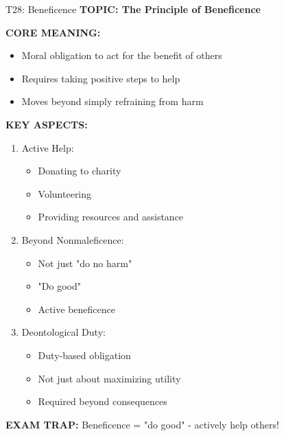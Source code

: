 \documentclass[8pt]{beamer}
\begin{document}
	\begin{frame}{T28: Beneficence}
		\fontsize{6.5}{7.5}\selectfont
		\textbf{TOPIC: The Principle of Beneficence}
		
		\vspace{0.1cm}
		\textbf{CORE MEANING:}
		\begin{itemize}
			\item Moral obligation to act for the benefit of others
			\item Requires taking positive steps to help
			\item Moves beyond simply refraining from harm
		\end{itemize}
		
		\vspace{0.1cm}
		\textbf{KEY ASPECTS:}
		\begin{enumerate}
			\item \textcolor{myblue}{Active Help:}
			\begin{itemize}
				\item Donating to charity
				\item Volunteering
				\item Providing resources and assistance
			\end{itemize}
			\item \textcolor{myblue}{Beyond Nonmaleficence:}
			\begin{itemize}
				\item Not just "do no harm"
				\item "Do good"
				\item Active beneficence
			\end{itemize}
			\item \textcolor{myblue}{Deontological Duty:}
			\begin{itemize}
				\item Duty-based obligation
				\item Not just about maximizing utility
				\item Required beyond consequences
			\end{itemize}
		\end{enumerate}
		
		\textcolor{myred}{\textbf{EXAM TRAP:}} Beneficence = \textcolor{myblue}{"do good"} - actively help others!
	\end{frame}
	
\end{document}
